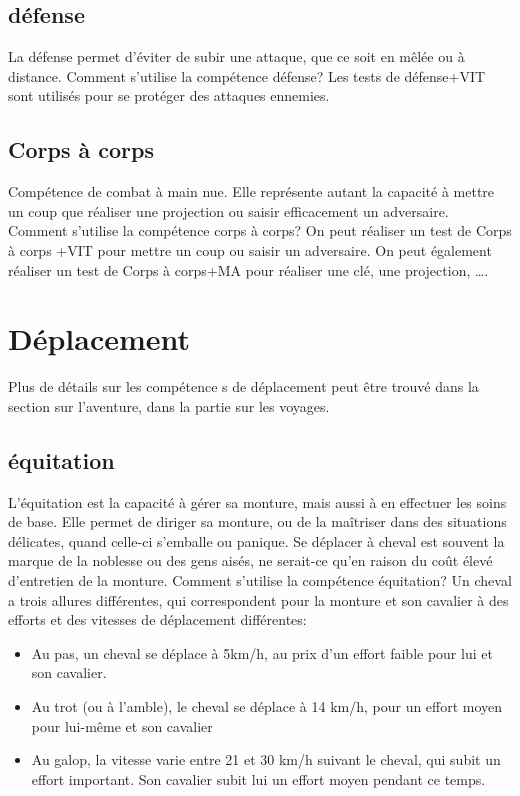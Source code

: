 \documentclass[10pt,a4paper,twocolumn]{book}
\begin{document}
\subsection*{défense}
La défense permet d’éviter de subir une attaque, que ce soit en mêlée ou à distance.
Comment s’utilise la compétence défense?
Les tests de défense+VIT sont utilisés pour se protéger des attaques ennemies. 
\subsection*{Corps à corps}
Compétence de combat à main nue. Elle représente autant la capacité à mettre un coup que réaliser une projection ou saisir efficacement un adversaire.
Comment s’utilise la compétence corps à corps?
On peut réaliser un test de Corps à corps +VIT pour mettre un coup ou saisir un adversaire. On peut également réaliser un test de Corps à corps+MA pour réaliser une clé, une projection, ….
\section{Déplacement}
Plus de détails sur les compétence s de déplacement peut être trouvé dans la section sur l’aventure, dans la partie sur les voyages.
\subsection*{équitation}
L’équitation est la capacité à gérer sa monture, mais aussi à en effectuer les soins de base. Elle permet de diriger sa monture, ou de la maîtriser dans des situations délicates, quand celle-ci s’emballe ou panique. Se déplacer à cheval est souvent la marque de la noblesse ou des gens aisés, ne serait-ce qu’en raison du coût élevé d’entretien de la monture.
Comment s’utilise la compétence équitation?
Un cheval a trois allures différentes, qui correspondent pour la monture et son cavalier à des efforts et des vitesses de déplacement différentes:
\begin{itemize}
\item Au pas, un cheval se déplace à 5km/h, au prix d’un effort faible pour lui et son cavalier.
\item Au trot (ou à l’amble), le cheval se déplace à 14 km/h, pour un effort moyen pour lui-même et son cavalier
\item Au galop, la vitesse varie entre 21 et 30 km/h suivant le cheval, qui subit un effort important. Son cavalier subit lui un effort moyen pendant ce temps.
\end{itemize}
\end{document}

